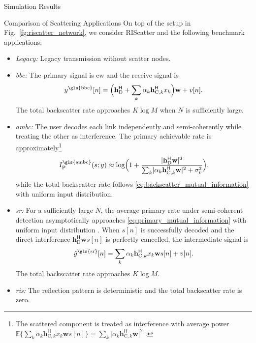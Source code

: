 \begin{section}{Simulation Results}
	\begin{subsection}{Comparison of Scattering Applications}
		On top of the setup in Fig.~\ref{fg:riscatter_network}, we consider RIScatter and the following benchmark applications:
		\begin{itemize}
			\item \emph{Legacy:} Legacy transmission without scatter nodes.
			\item \emph{\gls{bbc}:} The primary signal is \gls{cw} and the receive signal is
			\begin{equation}
				y^{\text{\gls{bbc}}}[n] = \Bigl(\mathbf{h}_{\text{D}}^\mathsf{H} + \sum_{k} \alpha_k \mathbf{h}_{\text{C},k}^\mathsf{H} x_k\Bigr) \mathbf{w} + v[n].
			\end{equation}
			The total backscatter rate approaches $K \log M$ when $N$ is sufficiently large.
			\item \emph{\gls{ambc}:} The user decodes each link independently and semi-coherently while treating the other as interference.
			The primary achievable rate is approximately\footnote{The scattered component is treated as interference with average power $\mathbb{E}\bigl\{\sum_{k} \alpha_k \mathbf{h}_{\text{C},k}^\mathsf{H} x_k \mathbf{w}s[n]\bigr\} = \sum_{k} \lvert \alpha_k \mathbf{h}_{\text{C},k}^\mathsf{H} \mathbf{w} \rvert^2$ \cite{Long2020a}.\label{fn:ambc}}
			\begin{equation}
				I_{\text{P}}^{\text{\gls{ambc}}}(s;y) \approx \log \Bigl(1 + \frac{\lvert\mathbf{h}_{\text{D}}^\mathsf{H}\mathbf{w}\rvert^2}{\sum_{k}\lvert \alpha_k \mathbf{h}_{\text{C},k}^\mathsf{H} \mathbf{w}\rvert^2+\sigma_v^2}\Bigr),
			\end{equation}
			while the total backscatter rate follows \eqref{eq:backscatter_mutual_information} with uniform input distribution.
			\item \emph{\gls{sr}:} For a sufficiently large $N$, the average primary rate under semi-coherent detection asymptotically approaches \eqref{eq:primary_mutual_information} with uniform input distribution \cite{Long2020a}.
			When $s[n]$ is successfully decoded and the direct interference $\mathbf{h}_{\text{D}}^\mathsf{H} \mathbf{w} s[n]$ is perfectly cancelled, the intermediate signal is
			\begin{equation}
				\hat{y}^{\text{\gls{sr}}}[n] = \sum_{k} \alpha_k \mathbf{h}_{\text{C},k}^\mathsf{H} x_k \mathbf{w} s[n] + v[n].
				\label{eq:intermediate_signal}
			\end{equation}
			The total backscatter rate approaches $K \log M$.
			\item \emph{\gls{ris}:} The reflection pattern is deterministic and the total backscatter rate is zero.

\end{itemize}
\end{subsection}
\end{section}

